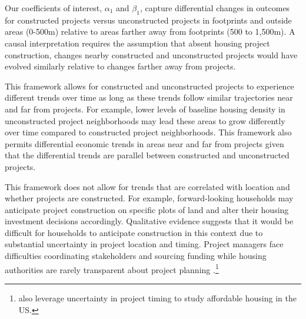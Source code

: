 \documentclass[12pt]{article}
\begin{document}
Our coefficients of interest, $\alpha_1$ and $\beta_1$, capture differential changes in outcomes for constructed projects versus unconstructed projects in footprints and outside areas (0-500m) relative to areas farther away from footprints (500 to 1,500m).  A causal interpretation requires the assumption that absent housing project construction, changes nearby constructed and unconstructed projects would have evolved similarly relative to changes farther away from projects.  

This framework allows for constructed and unconstructed projects to experience different trends over time as long as these trends follow similar trajectories near and far from projects.  For example, lower levels of baseline housing density in unconstructed project neighborhoods may lead these areas to grow differently over time compared to constructed project neighborhoods.  This framework also permits differential economic trends in areas near and far from projects given that the differential trends are parallel between constructed and unconstructed projects.  

This framework does not allow for trends that are correlated with location and whether projects are constructed.  For example, forward-looking households may anticipate project construction on specific plots of land and alter their housing investment decisions accordingly.  Qualitative evidence suggests that it would be difficult for households to anticipate construction in this context due to substantial uncertainty in project location and timing.  Project managers face difficulties coordinating stakeholders and sourcing funding while housing authorities are rarely transparent about project planning \citep{serihistory}.\footnote{\cite{diamond2016wants} also leverage uncertainty in project timing to study affordable housing in the US.} 






\end{document}
